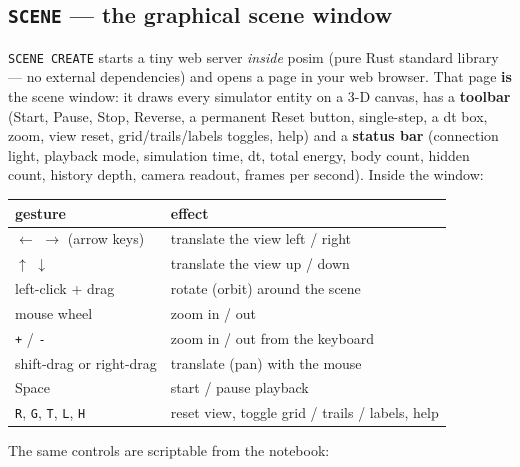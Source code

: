 \documentclass[11pt]{article}
\newcommand{\kw}[1]{\texttt{\uppercase{#1}}}
\newcommand{\code}[1]{\texttt{#1}}
\begin{document}
\subsection{\kw{scene} --- the graphical scene window}

\kw{scene create} starts a tiny web server \emph{inside} posim (pure
Rust standard library --- no external dependencies) and opens a page in
your web browser. That page \textbf{is} the scene window: it draws
every simulator entity on a 3-D canvas, has a \textbf{toolbar} (Start,
Pause, Stop, Reverse, a permanent Reset button, single-step, a dt box,
zoom, view reset, grid/trails/labels toggles, help) and a
\textbf{status bar} (connection light, playback mode, simulation time,
dt, total energy, body count, hidden count, history depth, camera
readout, frames per second). Inside the window:

\begin{center}
\begin{tabular}{lp{8.4cm}}
\textbf{gesture} & \textbf{effect}\\\hline
$\leftarrow$ $\rightarrow$ (arrow keys) & translate the view left / right\\
$\uparrow$ $\downarrow$ & translate the view up / down\\
left-click + drag & rotate (orbit) around the scene\\
mouse wheel & zoom in / out\\
\code{+} / \code{-} & zoom in / out from the keyboard\\
shift-drag or right-drag & translate (pan) with the mouse\\
Space & start / pause playback\\
\code{R}, \code{G}, \code{T}, \code{L}, \code{H} & reset view, toggle grid / trails / labels, help\\
\end{tabular}
\end{center}

The same controls are scriptable from the notebook:
\end{document}
